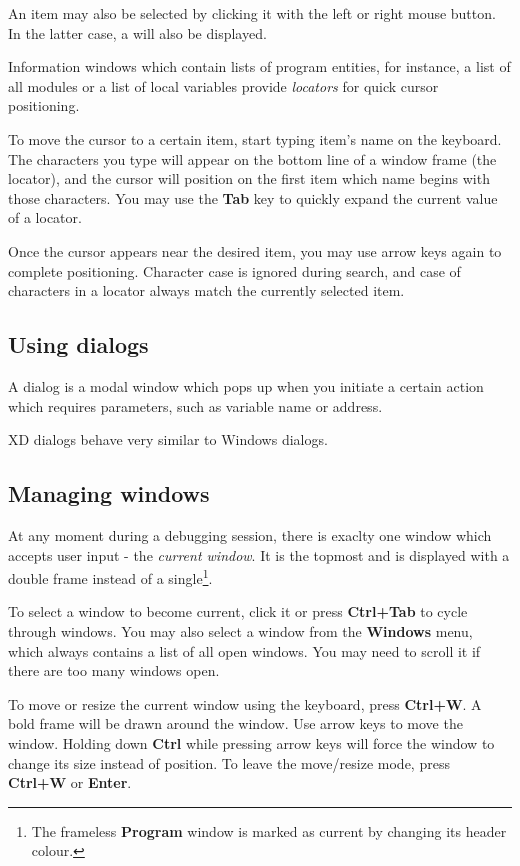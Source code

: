 An item may also be selected by clicking it with the left or right mouse button.
In the latter case, a  will also be displayed.

Information windows which contain lists of program entities,
for instance, a list of all modules or a list of local variables
provide {\em locators} for quick cursor positioning.

To move the cursor to a certain item, start typing item's name on the keyboard.
The characters you type will appear on the bottom line of a window frame
(the locator), and the cursor will position on the first item which name 
begins with those characters. You may use the {\bf Tab} key
to quickly expand the current value of a locator.

Once the cursor appears near the desired item, you may use arrow keys
again to complete positioning. Character case is ignored during search, and
case of characters in a locator always match the currently selected item.

\subsection{Using dialogs}
\label{dialog:intro:dialogs}

A dialog is a modal window which pops up when you initiate a certain
action which requires parameters, such as variable name or address.

XD dialogs behave very similar to Windows dialogs.

\subsection{Managing windows}
\label{dialog:intro:windows}

At any moment during a debugging session, there is exaclty one
window which accepts user input - the {\it current window}.
It is the topmost and is displayed with a double frame instead of
a single\footnote{The frameless {\bf Program} window is marked as current
by changing its header colour.}.

To select a window to become current, click it or press {\bf Ctrl+Tab}
to cycle through windows. You may also select a window from the
{\bf Windows} menu, which always contains a list of all open windows.
You may need to scroll it if there are too many windows open.

To move or resize the current window using the keyboard,
press {\bf Ctrl+W}. A bold frame will be drawn around the window.
Use arrow keys to move the window.
Holding down {\bf Ctrl} while pressing arrow keys will force
the window to change its size instead of position.
To leave the move/resize mode, press {\bf Ctrl+W} or {\bf Enter}.


